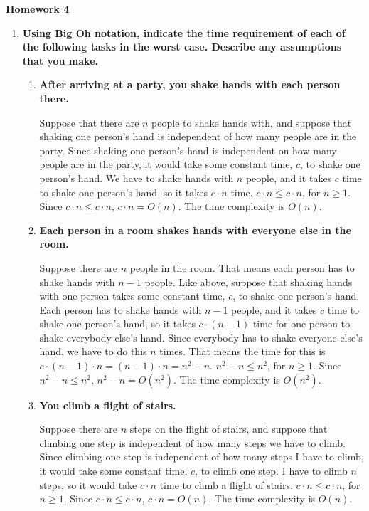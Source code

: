 \documentclass[10pt]{article}
\begin{document}
	\begin{center}
		\textbf{\large{Homework 4}}
	\end{center}
	
	\begin{enumerate}
		\setcounter{enumi}{0}
		\item \textbf{Using Big Oh notation, indicate the time requirement of each of the following tasks in the worst case. Describe any assumptions that you make.}
			\begin{enumerate}
				\item \textbf{After arriving at a party, you shake hands with each person there.}
					
					\vspace{0.5cm}
					Suppose that there are $n$ people to shake hands with, and suppose that shaking one person's hand is independent of how many people are in the party. Since shaking one person's hand is independent on how many people are in the party, it would take some constant time, $c$, to shake one person's hand. We have to shake hands with $n$ people, and it takes $c$ time to shake one person's hand, so it takes $c \cdot n$ time. $c \cdot n \leq c \cdot n$, for $n \geq 1$. Since $c \cdot n \leq c \cdot n$, $c \cdot n = O(n)$. The time complexity is $O(n)$.
					\vspace{0.5cm}
				
				\item \textbf{Each person in a room shakes hands with everyone else in the room.}
					
					\vspace{0.5cm}
					Suppose there are $n$ people in the room. That means each person has to shake hands with $n-1$ people. Like above, suppose that shaking hands with one person takes some constant time, $c$, to shake one person's hand. Each person has to shake hands with $n-1$ people, and it takes $c$ time to shake one person's hand, so it takes $c \cdot (n-1)$ time for one person to shake everybody else's hand. Since everybody has to shake everyone else's hand, we have to do this $n$ times. That means the time for this is $c \cdot (n - 1) \cdot n = (n - 1) \cdot n = n^2 - n$. $n^2 - n \leq n^2$, for $n \geq 1$. Since $n^2 - n \leq n^2$, $n^2 - n = O(n^2)$. The time complexity is $O(n^2)$.
					\vspace{0.5cm}
				
				\item \textbf{You climb a flight of stairs.}
					
					\vspace{0.5cm}
					Suppose there are $n$ steps on the flight of stairs, and suppose that climbing one step is independent of how many steps we have to climb. Since climbing one step is independent of how many steps I have to climb, it would take some constant time, $c$, to climb one step. I have to climb $n$ steps, so it would take $c \cdot n$ time to climb a flight of stairs. $c \cdot n \leq c \cdot n$, for $n \geq 1$. Since $c \cdot n \leq c \cdot n$, $c \cdot n = O(n)$. The time complexity is $O(n)$.
					\vspace{0.5cm}
				

\end{enumerate}
\end{enumerate}
\end{document}
